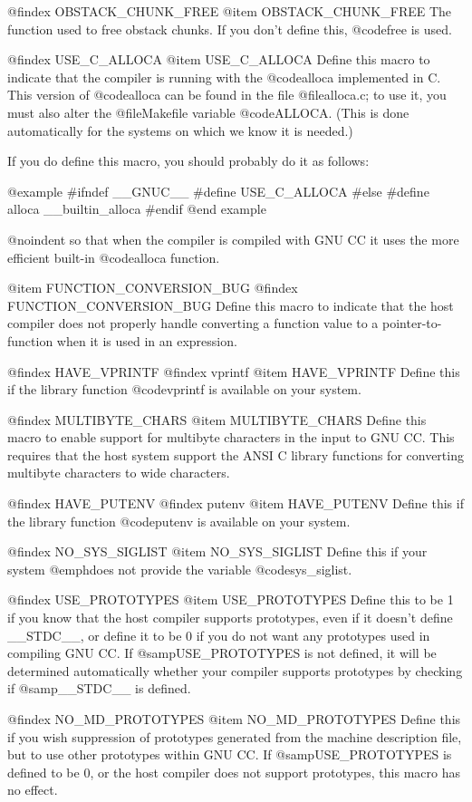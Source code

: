@findex OBSTACK_CHUNK_FREE
@item OBSTACK_CHUNK_FREE
The function used to free obstack chunks.
If you don't define this, @code{free} is used.

@findex USE_C_ALLOCA
@item USE_C_ALLOCA
Define this macro to indicate that the compiler is running with the
@code{alloca} implemented in C.  This version of @code{alloca} can be
found in the file @file{alloca.c}; to use it, you must also alter the
@file{Makefile} variable @code{ALLOCA}.  (This is done automatically
for the systems on which we know it is needed.)

If you do define this macro, you should probably do it as follows:

@example
#ifndef __GNUC__
#define USE_C_ALLOCA
#else
#define alloca __builtin_alloca
#endif
@end example

@noindent
so that when the compiler is compiled with GNU CC it uses the more
efficient built-in @code{alloca} function.

@item FUNCTION_CONVERSION_BUG
@findex FUNCTION_CONVERSION_BUG
Define this macro to indicate that the host compiler does not properly
handle converting a function value to a pointer-to-function when it is
used in an expression.

@findex HAVE_VPRINTF
@findex vprintf
@item HAVE_VPRINTF
Define this if the library function @code{vprintf} is available on your
system.

@findex MULTIBYTE_CHARS
@item MULTIBYTE_CHARS
Define this macro to enable support for multibyte characters in the
input to GNU CC.  This requires that the host system support the ANSI C
library functions for converting multibyte characters to wide
characters.

@findex HAVE_PUTENV
@findex putenv
@item HAVE_PUTENV
Define this if the library function @code{putenv} is available on your
system.

@findex NO_SYS_SIGLIST
@item NO_SYS_SIGLIST
Define this if your system @emph{does not} provide the variable
@code{sys_siglist}.

@findex USE_PROTOTYPES
@item USE_PROTOTYPES
Define this to be 1 if you know that the host compiler supports
prototypes, even if it doesn't define __STDC__, or define
it to be 0 if you do not want any prototypes used in compiling
GNU CC.  If @samp{USE_PROTOTYPES} is not defined, it will be
determined automatically whether your compiler supports
prototypes by checking if @samp{__STDC__} is defined.

@findex NO_MD_PROTOTYPES
@item NO_MD_PROTOTYPES
Define this if you wish suppression of prototypes generated from
the machine description file, but to use other prototypes within
GNU CC.  If @samp{USE_PROTOTYPES} is defined to be 0, or the
host compiler does not support prototypes, this macro has no
effect.

